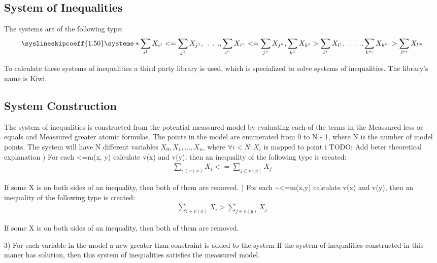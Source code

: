 \documentclass{article}
\begin{document}
	\newpage
	\subsection{System of Inequalities}
		The systems are of the following type:	
		\[
			\syslineskipcoeff{1.50}
			\systeme*{\sum_{i^1} X_{i^1} <= \sum_{j^1} X_{j^1},
				\:\:.\:\:.\:\:.,
				\sum_{i^n} X_{i^n} <= \sum_{j^n} X_{j^n}, 
				\sum_{k^1} X_{k^1} > \sum_{l^1} X_{l^1},
				\:\:.\:\:.\:\:.,
				\sum_{k^m} X_{k^m} > \sum_{l^m} X_{l^m}
				}
		\]
	
		To calculate these systems of inequalities a third party library is used, which is specialized 
		to solve systems of inequalities. The library's name is Kiwi.
		\newline
		\subsection{System Construction}
		The system of inequalities is constructed from the potential meassured model by evaluating each
		of the terms in the Meassured less or equals and Meassured greater atomic formulas. The points in the model are 
		enumerated from 0 to N - 1, where N is the number of model points. The system will have N different variables $X_0, X_1, ..., X_n$, 
		where $\forall i < N: X_i \text{ is mapped to point i}$
		\newline
		TODO: Add beter theoretical explanation
		\newline
		) For each <=m(x, y) calculate v(x) and v(y), then an inequality of the following type is created: 
		\begin{align*}
			\sum_{i \in v(x)} X_i <= \sum_{j \in v(y)} X_j
		\end{align*}

		If some X is on both sides of an inequality, then both of them are removed.
		) For each \textasciitilde<=m(x,y) calculate v(x) and v(y), then an inequality of the following type is created: 
		\begin{align*}
			\sum_{i \in v(x)} X_i > \sum_{j \in v(y)} X_j
		\end{align*}

		If some X is on both sides of an inequality, then both of them are removed.
		\newline

		3) For each variable in the model a new greater than constraint is added to the system
		\newline
		If the system of inequalities constructed in this maner has solution, then this system of inequalities
		satisfies the meassured model.
\end{document}

